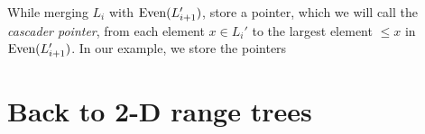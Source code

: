 \begin{solution}
    While merging $L_i$ with $\operatorname{Even}(L_{i+1}')$, store a pointer,
    which we will call the \emph{cascader pointer},
    from each element $x \in L_i'$ to the largest element $\le x$ in
    $\operatorname{Even}(L_{i+1}')$.
    In our example, we store the pointers
    \begin{center}
    \end{center}
\end{solution}

\section{Back to 2-D range trees} \label{sec:back-to-2-d-range-trees}
